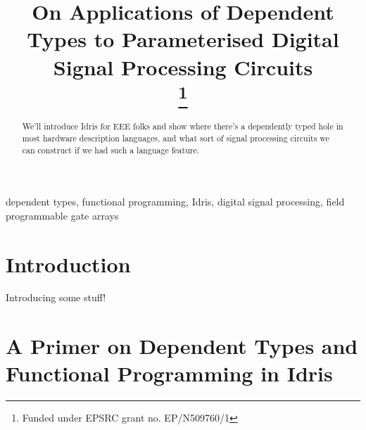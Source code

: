 \documentclass[conference]{IEEEtran}
\begin{document}
\title{On Applications of Dependent Types to Parameterised Digital Signal
  Processing Circuits \\
\thanks{Funded under EPSRC grant no. EP/N509760/1} }

\author{
\and
{}
\and
{}
}

\maketitle

\begin{abstract}
  We'll introduce Idris for EEE folks and show where there's a dependently typed
  hole in most hardware description languages, and what sort of signal
  processing circuits we can construct if we had such a language feature.
\end{abstract}

\begin{IEEEkeywords}
dependent types, functional programming, Idris, digital signal processing, field programmable gate arrays  
\end{IEEEkeywords}

\section{Introduction}

Introducing some stuff! \cite{dempster_mag}

\section{A Primer on Dependent Types and Functional Programming in Idris}
\end{document}
